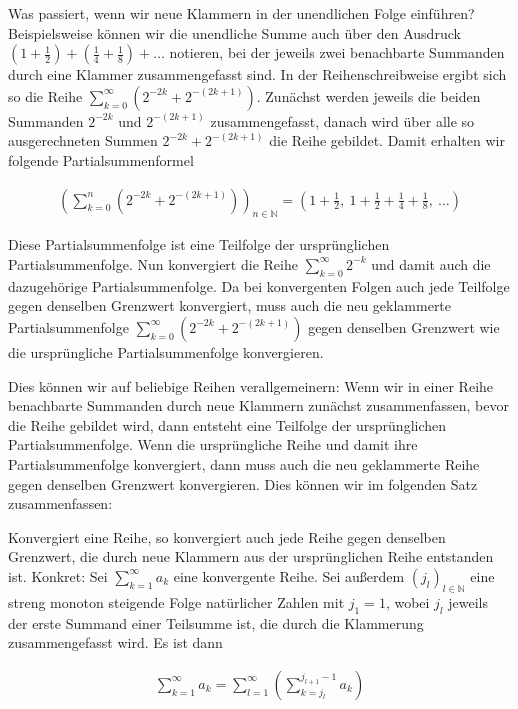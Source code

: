 \documentclass[fontsize=9pt,
               parskip=half-,
               DIV=14,
               listof=chapterentry,
               tocflat]{scrbook}
\begin{document}
Was passiert, wenn wir neue Klammern in der unendlichen Folge einführen? Beispielsweise können wir die unendliche Summe auch über den Ausdruck $\left(1+{\tfrac {1}{2}}\right)+\left({\tfrac {1}{4}}+{\tfrac {1}{8}}\right)+\ldots $ notieren, bei der jeweils zwei benachbarte Summanden durch eine Klammer zusammengefasst sind. In der Reihenschreibweise ergibt sich so die Reihe $\sum _{k=0}^{\infty }\left(2^{-2k}+2^{-(2k+1)}\right)$. Zunächst werden jeweils die beiden Summanden $2^{-2k}$ und $2^{-(2k+1)}$ zusammengefasst, danach wird über alle so ausgerechneten Summen $2^{-2k}+2^{-(2k+1)}$ die Reihe gebildet. Damit erhalten wir folgende Partialsummenformel

\begin{align*}
\left(\sum _{k=0}^{n}\left(2^{-2k}+2^{-(2k+1)}\right)\right)_{n\in \mathbb {N} }=\left(1+{\frac {1}{2}},\ 1+{\frac {1}{2}}+{\frac {1}{4}}+{\frac {1}{8}},\ \ldots \right)
\end{align*}

Diese Partialsummenfolge ist eine Teilfolge der ursprünglichen Partialsummenfolge. Nun konvergiert die Reihe $\sum _{k=0}^{\infty }2^{-k}$ und damit auch die dazugehörige Partialsummenfolge. Da bei konvergenten Folgen auch jede Teilfolge gegen denselben Grenzwert konvergiert, muss auch die neu geklammerte Partialsummenfolge $\sum _{k=0}^{\infty }\left(2^{-2k}+2^{-(2k+1)}\right)$ gegen denselben Grenzwert wie die ursprüngliche Partialsummenfolge konvergieren.

Dies können wir auf beliebige Reihen verallgemeinern: Wenn wir in einer Reihe benachbarte Summanden durch neue Klammern zunächst zusammenfassen, bevor die Reihe gebildet wird, dann entsteht eine Teilfolge der ursprünglichen Partialsummenfolge. Wenn die ursprüngliche Reihe und damit ihre Partialsummenfolge konvergiert, dann muss auch die neu geklammerte Reihe gegen denselben Grenzwert konvergieren. Dies können wir im folgenden Satz zusammenfassen:

\begin{theorem*}
Konvergiert eine Reihe, so konvergiert auch jede Reihe gegen denselben Grenzwert, die durch neue Klammern aus der ursprünglichen Reihe entstanden ist. Konkret: Sei $\sum _{k=1}^{\infty }a_{k}$ eine konvergente Reihe. Sei außerdem $(j_{l})_{l\in \mathbb {N} }$ eine streng monoton steigende Folge natürlicher Zahlen mit $j_{1}=1$, wobei $j_{l}$ jeweils der erste Summand einer Teilsumme ist, die durch die Klammerung zusammengefasst wird. Es ist dann

\begin{align*}
\sum _{k=1}^{\infty }a_{k}=\sum _{l=1}^{\infty }\left(\sum _{k=j_{l}}^{j_{l+1}-1}a_{k}\right)
\end{align*}

\end{theorem*}
\end{document}
